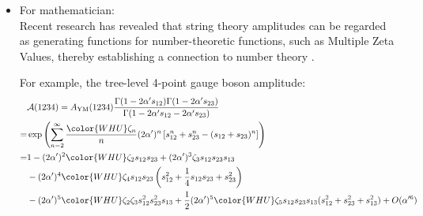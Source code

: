 \documentclass{beamer}
\begin{document}
\begin{frame}\label{drinfield}
	\begin{itemize}
		\item {\color{WHU} For mathematician:}\\
		Recent research has revealed that string theory amplitudes can be regarded as generating functions for number-theoretic functions, such as Multiple Zeta Values, thereby establishing a connection to number theory \cite{Broedel:2013aza}.
		
		For example, the tree-level 4-point gauge boson amplitude:
		\begin{equation*}
			\begin{aligned}
					&\mathcal{A}(1234)=A_{\text{YM}}(1234)\frac{\Gamma(1-2\alpha^{\prime}s_{12})\Gamma(1-2\alpha^{\prime}s_{23})}{\Gamma(1-2\alpha^{\prime}s_{12}-2\alpha^{\prime}s_{23})}\\
					=&\exp\left(\sum_{n-2}^\infty\frac{\color{WHU}\zeta_n}{n}(2\alpha^{\prime})^n\left[s_{12}^n+s_{23}^n-(s_{12}+s_{23})^n\right]\right)\\
					=&1-(2\alpha^{\prime})^2{\color{WHU}\zeta_2}s_{12}s_{23}+(2\alpha^{\prime})^3\zeta_3s_{12}s_{23}s_{13}\\
					&-(2\alpha^{\prime})^4{\color{WHU}\zeta_4}s_{12}s_{23}\left(s_{12}^2+\frac{1}{4}s_{12}s_{23}+s_{23}^2\right)\\
					&-(2\alpha^{\prime})^5{\color{WHU}\zeta_2\zeta_3}s_{12}^2s_{23}^2s_{13}+\frac{1}{2}(2\alpha^{\prime})^5{\color{WHU}\zeta_5}s_{12}s_{23}s_{13}(s_{12}^2+s_{23}^2+s_{13}^2)+O(\alpha^{\prime6})
			\end{aligned}
		\end{equation*}
	\end{itemize}
\end{frame}
\end{document}
